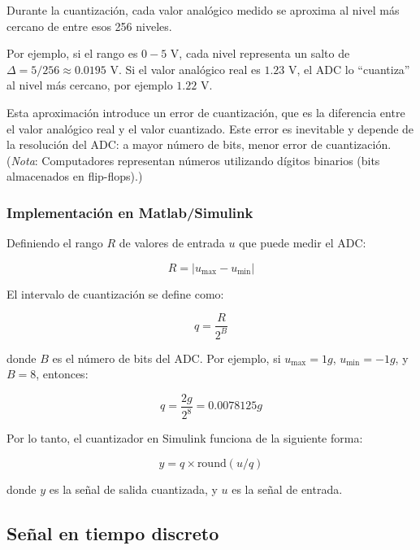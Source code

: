Durante la cuantización, cada valor analógico medido se aproxima al nivel más cercano de entre esos 256 niveles.

Por ejemplo, si el rango es $0 - 5$ V, cada nivel representa un salto de $\Delta = 5/256 \approx 0.0195$ V. Si el valor analógico real es $1.23$ V, el ADC lo “cuantiza” al nivel más cercano, por ejemplo $1.22$ V.

Esta aproximación introduce un error de cuantización, que es la diferencia entre el valor analógico real y el valor cuantizado. Este error es inevitable y depende de la resolución del ADC: a mayor número de bits, menor error de cuantización. (\emph{Nota}: Computadores representan números utilizando dígitos binarios (bits almacenados en flip-flops).)\\

\subsubsection{Implementación en Matlab/Simulink}

Definiendo el rango $R$ de valores de entrada $u$ que puede medir el ADC:

\begin{equation}
    R = |u_{\max} - u_{\min}|
\end{equation}

El intervalo de cuantización se define como:

\begin{equation}
    q = \frac{R}{2^B}
\end{equation}

donde $B$ es el número de bits del ADC. Por ejemplo, si $u_{\max} = 1g$, $u_{\min} = -1g$, y $B = 8$, entonces:

\begin{equation}
    q = \frac{2g}{2^{8}} = 0.0078125 g
\end{equation}

Por lo tanto, el cuantizador en Simulink funciona de la siguiente forma:

\begin{equation}
    y = q \times \text{round}(u/q)
\end{equation}

donde $y$ es la señal de salida cuantizada, y $u$ es la señal de entrada.



\subsection{Señal en tiempo discreto}

